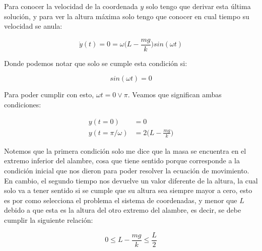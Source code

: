 \documentclass{article}
\begin{document}
Para conocer la velocidad de la coordenada $y$ solo tengo que derivar esta última solución, y para ver la altura máxima solo tengo que conocer en cual tiempo su velocidad se anula:

\begin{equation}
    \dot{y}(t) = 0 = \omega \bigg(L - \frac{mg}{k}\bigg)sin(\omega t)
\end{equation}

Donde podemos notar que solo se cumple esta condición si:

\begin{equation}
    sin(\omega t) = 0
\end{equation}

Para poder cumplir con esto, $\omega t = 0 \vee \pi$. Veamos que significan ambas condiciones:

\begin{equation}
    \begin{split}
        y(t = 0) &= 0 \\
        y(t = \pi/\omega) &= 2 \bigg( L - \frac{mg}{k} \bigg)
    \end{split}
\end{equation}

Notemos que la primera condición solo me dice que la masa se encuentra en el extremo inferior del alambre, cosa que tiene sentido porque corresponde a la condición inicial que nos dieron para poder resolver la ecuación de movimiento. En cambio, el segundo tiempo nos devuelve un valor diferente de la altura, la cual solo va a tener sentido si se cumple que su altura sea siempre mayor a cero, esto es por como selecciona el problema el sistema de coordenadas, y menor que $L$ debido a que esta es la altura del otro extremo del alambre, es decir, se debe cumplir la siguiente relación:

\begin{equation}
    0 \leq L - \frac{mg}{k} \leq \frac{L}{2}
\end{equation}
\end{document}

